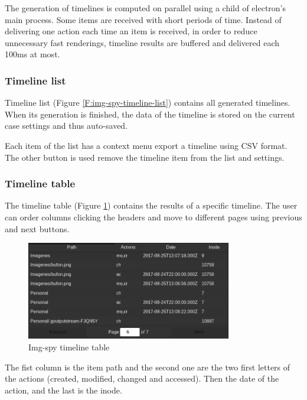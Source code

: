 The generation of timelines is computed on parallel using a child of electron's
main process. Some items are received with short periods of time. Instead of 
delivering one action each time an item is received, in order to reduce
unnecessary fast renderings, timeline results are buffered and delivered each
100ms at most.

\subsubsection{Timeline list}

Timeline list (Figure \ref{F:img-spy-timeline-list}) contains all generated
timelines. When its generation is finished, the data of the timeline is stored
on the current case settings and thus auto-saved.

Each item of the list has a context menu export a timeline using CSV format.
The other button is used remove the timeline item from the list and settings.

\subsubsection{Timeline table}

The timeline table (Figure \ref{F:img-spy-timeline-table}) contains the results
of a specific timeline. The user can order columns clicking the headers and 
move to different pages using previous and next buttons.

\begin{figure}[htb]
	\begin{center}
		\includegraphics[width=0.8\textwidth]
		{./figures/timeline-table.png}
		\caption{Img-spy timeline table}
		\label{F:img-spy-timeline-table}
	\end{center}
\end{figure}

The fist column is the item path and the second one are the two first letters of
the actions (created, modified, changed and accessed). Then the date of the 
action, and the last is the inode.

